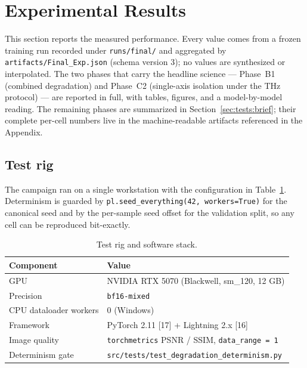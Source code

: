 \section{Experimental Results}
\label{sec:tests}

This section reports the measured performance. Every value comes from a
frozen training run recorded under \texttt{runs/final/} and aggregated by
\texttt{artifacts/Final\_Exp.json} (schema version 3); no values are
synthesized or interpolated. The two phases that carry the headline science
--- Phase~B1 (combined degradation) and Phase~C2 (single-axis isolation under
the THz protocol) --- are reported in full, with tables, figures, and a
model-by-model reading. The remaining phases are summarized in
Section~\ref{sec:tests:brief}; their complete per-cell numbers live in the
machine-readable artifacts referenced in the Appendix.

\subsection{Test rig}
\label{sec:tests:rig}
The campaign ran on a single workstation with the configuration in
Table~\ref{tab:rig}. Determinism is guarded by
\texttt{pl.seed\_everything(42, workers=True)} for the canonical seed and by
the per-sample seed offset for the validation split, so any cell can be
reproduced bit-exactly.

\begin{table}[htbp]
\centering
\caption{Test rig and software stack.}
\label{tab:rig}
\setlength{\tabcolsep}{4pt}
\renewcommand{\arraystretch}{1.1}
\begin{tabular}{ll}
\toprule
Component & Value \\
\midrule
GPU                & NVIDIA RTX 5070 (Blackwell, sm\_120, 12 GB) \\
Precision          & \texttt{bf16-mixed} \\
CPU dataloader workers & 0 (Windows) \\
Framework          & PyTorch 2.11 [17] + Lightning 2.x [16] \\
Image quality      & \texttt{torchmetrics} PSNR / SSIM, \texttt{data\_range = 1} \\
Determinism gate   & \texttt{src/tests/test\_degradation\_determinism.py} \\
\bottomrule
\end{tabular}
\end{table}

